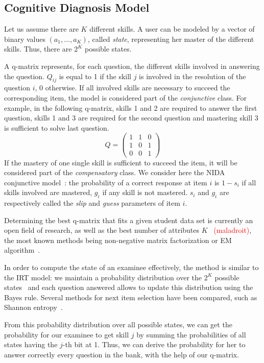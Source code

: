 \documentclass{sig-alternate}
\newcommand\alert[1]{\textcolor{red}{#1}}
\begin{document}
\subsection{Cognitive Diagnosis Model}

Let us assume there are $K$ different skills. A user can be modeled by a vector of binary values $(a_1, \ldots, a_K)$, called \emph{state}, representing her master of the different skills. Thus, there are $2^K$ possible states.

A q-matrix \cite{Tatsuoka1983} represents, for each question, the different skills involved in answering the question. $Q_{ij}$ is equal to 1 if the skill $j$ is involved in the resolution of the question $i$, 0 otherwise. If all involved skills are necessary to succeed the corresponding item, the model is considered part of the \emph{conjunctive} class. For example, in the following q-matrix, skills 1 and 2 are required to answer the first question, skills 1 and 3 are required for the second question and mastering skill 3 is sufficient to solve last question.
\[ Q = \left(\begin{array}{lll}
1 & 1 & 0\\
1 & 0 & 1\\
0 & 0 & 1
\end{array}\right) \]
If the mastery of one single skill is sufficient to succeed the item, it will be considered part of the \emph{compensatory} class. We consider here the NIDA conjunctive model~\cite{Desmarais2012}: the probability of a correct response at item $i$ is $1 - s_i$ if all skills involved are mastered, $g_i$ if any skill is not mastered. $s_i$ and $g_i$ are respectively called the \emph{slip} and \emph{guess} parameters of item $i$.

Determining the best q-matrix that fits a given student data set is currently an open field of research, as well as the best number of attributes $K$~\cite{Huebner2010} \alert{(maladroit)}, the most known methods being non-negative matrix factorization or EM algorithm~\cite{Huebner2010}. 

In order to compute the state of an examinee effectively, the method is similar to the IRT model: we maintain a probability distribution over the $2^K$ possible states~\cite{Huebner2010} and each question answered allows to update this distribution using the Bayes rule. Several methods for next item selection have been compared, such as Shannon entropy~\cite{Xu2003}.

From this probability distribution over all possible states, we can get the probability for our examinee to get skill $j$ by summing the probabilities of all states having the $j$-th bit at 1. Thus, we can derive the probability for her to answer correctly every question in the bank, with the help of our q-matrix.
\end{document}
